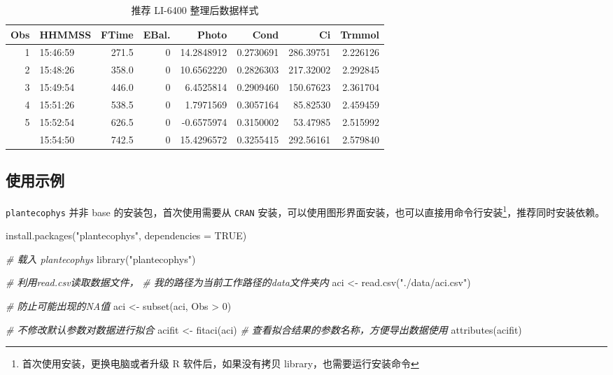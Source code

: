 \documentclass[
]{krantz}
\makeatletter
\newenvironment{Shaded}{\begin{snugshade}}{\end{snugshade}}
\newcommand{\AttributeTok}[1]{\textcolor[rgb]{0.77,0.63,0.00}{#1}}
\newcommand{\CommentTok}[1]{\textcolor[rgb]{0.56,0.35,0.01}{\textit{#1}}}
\newcommand{\ConstantTok}[1]{\textcolor[rgb]{0.00,0.00,0.00}{#1}}
\newcommand{\DecValTok}[1]{\textcolor[rgb]{0.00,0.00,0.81}{#1}}
\newcommand{\FunctionTok}[1]{\textcolor[rgb]{0.00,0.00,0.00}{#1}}
\newcommand{\NormalTok}[1]{#1}
\newcommand{\OtherTok}[1]{\textcolor[rgb]{0.56,0.35,0.01}{#1}}
\newcommand{\SpecialCharTok}[1]{\textcolor[rgb]{0.00,0.00,0.00}{#1}}
\newcommand{\StringTok}[1]{\textcolor[rgb]{0.31,0.60,0.02}{#1}}
\newenvironment{kframe}{%
\medskip{}
\setlength{\fboxsep}{.8em}
 \def\at@end@of@kframe{}%
 \ifinner\ifhmode%
  \def\at@end@of@kframe{\end{minipage}}%
  \begin{minipage}{\columnwidth}%
 \fi\fi%
 \def\FrameCommand##1{\hskip\@totalleftmargin \hskip-\fboxsep
 \colorbox{shadecolor}{##1}\hskip-\fboxsep
     \hskip-\linewidth \hskip-\@totalleftmargin \hskip\columnwidth}%
 \MakeFramed {\advance\hsize-\width
   \@totalleftmargin\z@ \linewidth\hsize
   \@setminipage}}%
 {\par\unskip\endMakeFramed%
 \at@end@of@kframe}
\renewenvironment{Shaded}{\begin{kframe}}{\end{kframe}}
\makeatother
\begin{document}
\begin{longtable}[t]{rlrrrrrr}
\caption{\label{tab:head6400}推荐 LI-6400 整理后数据样式}\\
\toprule
Obs & HHMMSS & FTime & EBal. & Photo & Cond & Ci & Trmmol\\
\midrule
1 & 15:46:59 & 271.5 & 0 & 14.2848912 & 0.2730691 & 286.39751 & 2.226126\\
2 & 15:48:26 & 358.0 & 0 & 10.6562220 & 0.2826303 & 217.32002 & 2.292845\\
3 & 15:49:54 & 446.0 & 0 & 6.4525814 & 0.2909460 & 150.67623 & 2.361704\\
4 & 15:51:26 & 538.5 & 0 & 1.7971569 & 0.3057164 & 85.82530 & 2.459459\\
5 & 15:52:54 & 626.5 & 0 & -0.6575974 & 0.3150002 & 53.47985 & 2.515992\\
\addlinespace
6 & 15:54:50 & 742.5 & 0 & 15.4296572 & 0.3255415 & 292.56161 & 2.579840\\
\bottomrule
\end{longtable}

\hypertarget{fitaci-p}{%
\subsection{使用示例}\label{fitaci-p}}

\texttt{plantecophys} 并非 base 的安装包，首次使用需要从 \texttt{CRAN} 安装，可以使用图形界面安装，也可以直接用命令行安装\footnote{首次使用安装，更换电脑或者升级 R 软件后，如果没有拷贝 library，也需要运行安装命令}，推荐同时安装依赖。

\begin{Shaded}
\begin{Highlighting}[]
\FunctionTok{install.packages}\NormalTok{(}\StringTok{"plantecophys"}\NormalTok{, }\AttributeTok{dependencies =} \ConstantTok{TRUE}\NormalTok{)}
\end{Highlighting}
\end{Shaded}

\begin{Shaded}
\begin{Highlighting}[]
\CommentTok{\# 载入 plantecophys }
\FunctionTok{library}\NormalTok{(}\StringTok{"plantecophys"}\NormalTok{)}

\CommentTok{\# 利用read.csv读取数据文件，}
\CommentTok{\# 我的路径为当前工作路径的data文件夹内}
\NormalTok{aci }\OtherTok{\textless{}{-}} \FunctionTok{read.csv}\NormalTok{(}\StringTok{"./data/aci.csv"}\NormalTok{)}

\CommentTok{\# 防止可能出现的NA值}
\NormalTok{aci }\OtherTok{\textless{}{-}} \FunctionTok{subset}\NormalTok{(aci, Obs }\SpecialCharTok{\textgreater{}} \DecValTok{0}\NormalTok{)}

\CommentTok{\# 不修改默认参数对数据进行拟合}
\NormalTok{acifit }\OtherTok{\textless{}{-}} \FunctionTok{fitaci}\NormalTok{(aci)}
\CommentTok{\# 查看拟合结果的参数名称，方便导出数据使用}
\FunctionTok{attributes}\NormalTok{(acifit)}
\end{Highlighting}
\end{Shaded}
\end{document}
